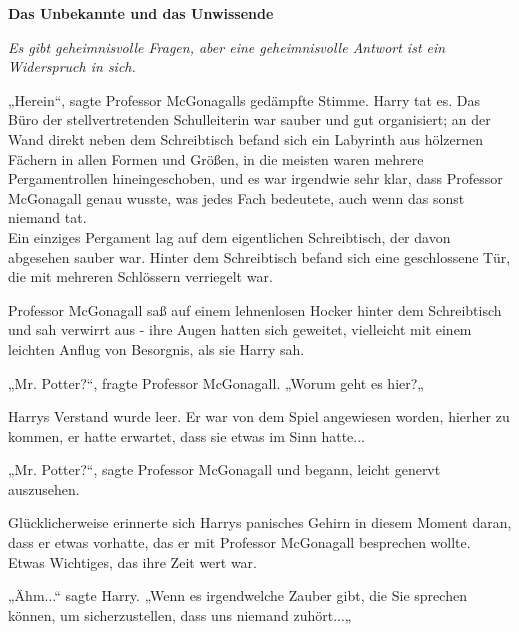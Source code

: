 

\hypertarget{das-unbekannte-und-das-unwissende}{%

\textbf{Das Unbekannte und das Unwissende}

\emph{Es gibt geheimnisvolle Fragen, aber eine geheimnisvolle Antwort ist ein Widerspruch in sich.}

„Herein“, sagte Professor McGonagalls gedämpfte Stimme. Harry tat es. Das Büro der stellvertretenden Schulleiterin war sauber und gut organisiert; an der Wand direkt neben dem Schreibtisch befand sich ein Labyrinth aus hölzernen Fächern in allen Formen und Größen, in die meisten waren mehrere Pergamentrollen hineingeschoben, und es war irgendwie sehr klar, dass Professor McGonagall genau wusste, was jedes Fach bedeutete, auch wenn das sonst niemand tat.\\ Ein einziges Pergament lag auf dem eigentlichen Schreibtisch, der davon abgesehen sauber war. Hinter dem Schreibtisch befand sich eine geschlossene Tür, die mit mehreren Schlössern verriegelt war.

Professor McGonagall saß auf einem lehnenlosen Hocker hinter dem Schreibtisch und sah verwirrt aus - ihre Augen hatten sich geweitet, vielleicht mit einem leichten Anflug von Besorgnis, als sie Harry sah.

„Mr. Potter?“, fragte Professor McGonagall. „Worum geht es hier?„

Harrys Verstand wurde leer. Er war von dem Spiel angewiesen worden, hierher zu kommen, er hatte erwartet, dass sie etwas im Sinn hatte...

„Mr. Potter?“, sagte Professor McGonagall und begann, leicht genervt auszusehen.

Glücklicherweise erinnerte sich Harrys panisches Gehirn in diesem Moment daran, dass er etwas vorhatte, das er mit Professor McGonagall besprechen wollte.\\ Etwas Wichtiges, das ihre Zeit wert war.

„Ähm...“ sagte Harry. „Wenn es irgendwelche Zauber gibt, die Sie sprechen können, um sicherzustellen, dass uns niemand zuhört...„

}

